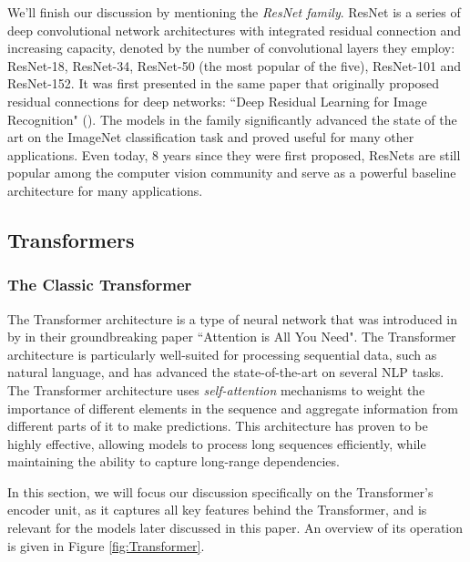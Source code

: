 \documentclass{article}
\begin{document}
\medskip
\noindent
We'll finish our discussion by mentioning the \emph{ResNet family}. ResNet is a series of deep convolutional network architectures with integrated residual connection and increasing capacity, denoted by the number of convolutional layers they employ: ResNet-18, ResNet-34, ResNet-50 (the most popular of the five), ResNet-101 and ResNet-152. It was first presented in the same paper that originally proposed residual connections for deep networks: ``Deep Residual Learning for Image Recognition" (\citet{he2016deep}). The models in the family significantly advanced the state of the art on the ImageNet classification task and proved useful for many other applications. Even today, 8 years since they were first proposed, ResNets are still popular among the computer vision community and serve as a powerful baseline architecture for many applications.



\subsection{Transformers}
\label{sec:Transformers}

\subsubsection{The Classic Transformer}
\label{subsec:Transformers}

The Transformer architecture is a type of neural network that was introduced in \citeyear{vaswani2017attention} by \citet{vaswani2017attention} in their groundbreaking paper ``Attention is All You Need". The Transformer architecture is particularly well-suited for processing sequential data, such as natural language, and has advanced the state-of-the-art on several NLP tasks. The Transformer architecture uses \emph{self-attention} mechanisms to weight the importance of different elements in the sequence and aggregate information from different parts of it to make predictions. This architecture has proven to be highly effective, allowing models to process long sequences efficiently, while maintaining the ability to capture long-range dependencies.

\medskip
\noindent
In this section, we will focus our discussion specifically on the Transformer's encoder unit, as it captures all key features behind the Transformer, and is relevant for the models later discussed in this paper. An overview of its operation is given in Figure \ref{fig:Transformer}. 
\end{document}
